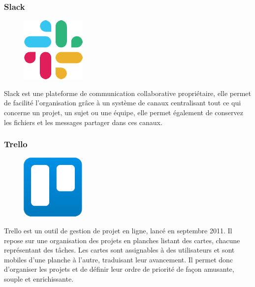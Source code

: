         \subsubsection*{Slack}
            \begin{figure}
                \vspace{-22pt}
              \begin{center}
                 \includegraphics[scale=0.36]{images/logo/slack.png}
                 \label{fig62}
              \end{center}
              \vspace{-20pt}
              \vspace{-10pt}
            \end{figure}
            Slack est une  plateforme de communication collaborative propriétaire, elle permet de facilité l’organisation grâce à un système de canaux centralisant tout ce qui concerne un projet, un sujet ou une équipe, elle permet également de conservez les fichiers et les messages partager dans ces canaux\cite{37}. 

        \clearpage
        
        \subsubsection*{Trello}
        
            \begin{figure}
                \vspace{-22pt}
              \begin{center}
                 \includegraphics[scale=0.36]{images/logo/trello.png}
                 \label{fig63}
              \end{center}
              \vspace{-20pt}
              \vspace{-10pt}
            \end{figure}
            Trello est un outil de gestion de projet en ligne, lancé en septembre 2011. Il repose sur une organisation des projets en planches listant des cartes, chacune représentant des tâches. Les cartes sont assignables à des utilisateurs et sont mobiles d’une planche à l’autre, traduisant leur avancement. Il permet donc d’organiser les projets et de définir leur ordre de priorité de façon amusante, souple et enrichissante\cite{38}.
